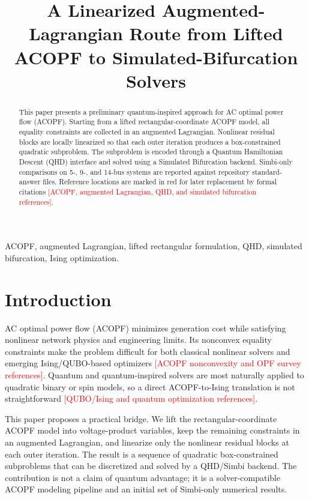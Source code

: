 \documentclass[conference]{IEEEtran}
\title{A Linearized Augmented-Lagrangian Route from Lifted ACOPF to Simulated-Bifurcation Solvers}
\author{\IEEEauthorblockN{Author Name(s)}
\IEEEauthorblockA{Department/Institute Name\\
University/Organization Name\\
Email: author@example.com}}
\newcommand{\needref}[1]{\textcolor{red}{[#1]}}
\begin{document}
\maketitle

\begin{abstract}
This paper presents a preliminary quantum-inspired approach for AC optimal power flow (ACOPF). Starting from a lifted rectangular-coordinate ACOPF model, all equality constraints are collected in an augmented Lagrangian. Nonlinear residual blocks are locally linearized so that each outer iteration produces a box-constrained quadratic subproblem. The subproblem is encoded through a Quantum Hamiltonian Descent (QHD) interface and solved using a Simulated Bifurcation backend. Simbi-only comparisons on 5-, 9-, and 14-bus systems are reported against repository standard-answer files. Reference locations are marked in red for later replacement by formal citations \needref{ACOPF, augmented Lagrangian, QHD, and simulated bifurcation references}.
\end{abstract}

\begin{IEEEkeywords}
ACOPF, augmented Lagrangian, lifted rectangular formulation, QHD, simulated bifurcation, Ising optimization.
\end{IEEEkeywords}

\section{Introduction}
AC optimal power flow (ACOPF) minimizes generation cost while satisfying nonlinear network physics and engineering limits. Its nonconvex equality constraints make the problem difficult for both classical nonlinear solvers and emerging Ising/QUBO-based optimizers \needref{ACOPF nonconvexity and OPF survey references}. Quantum and quantum-inspired solvers are most naturally applied to quadratic binary or spin models, so a direct ACOPF-to-Ising translation is not straightforward \needref{QUBO/Ising and quantum optimization references}.

This paper proposes a practical bridge. We lift the rectangular-coordinate ACOPF model into voltage-product variables, keep the remaining constraints in an augmented Lagrangian, and linearize only the nonlinear residual blocks at each outer iteration. The result is a sequence of quadratic box-constrained subproblems that can be discretized and solved by a QHD/Simbi backend. The contribution is not a claim of quantum advantage; it is a solver-compatible ACOPF modeling pipeline and an initial set of Simbi-only numerical results.
\end{document}
